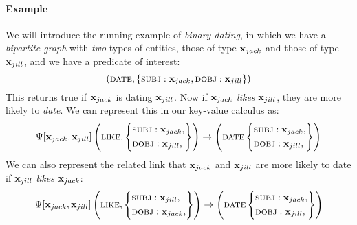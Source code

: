 \documentclass[11pt]{article}
\newcommand{\xvariable}{{\bf x}}
\newcommand{\xjack}{\xvariable_{jack}}
\newcommand{\xjill}{\xvariable_{jill}}
\begin{document}
\paragraph{Example}
We will introduce the running example of {\em binary dating}, in which we have a {\em bipartite graph} with {\em two} types of entities, those of type $\xjack$ and those of type $\xjill$, and we have a predicate of interest:
\begin{equation} (\textsc{date}, \left\{ \textsc{subj}: \xjack, \textsc{dobj}:\xjill\right\}) \end{equation}
This returns true if $\xjack$ is dating $\xjill$.
Now if $\xjack$ {\em likes} $\xjill$, they are more likely to {\em date}.
We can represent this in our key-value calculus as:
\begin{equation}
\Psi[\xjack, \xjill]\left(\textsc{like}, \left\{
    \begin{aligned}
    &\textsc{subj}: \xjack, \\
    &\textsc{dobj}: \xjill, \\
    \end{aligned}
    \right\} \right)
    \rightarrow \left(
    \textsc{date}
\left\{
    \begin{aligned}
    &\textsc{subj}: \xjack, \\
    &\textsc{dobj}: \xjill, \\
    \end{aligned}
    \right\}
    \right)
\label{eq:like-date-same}
\end{equation}
We can also represent the related link that $\xjack$ and $\xjill$ are more likely to date if $\xjill$ {\em likes} $\xjack$:
\begin{equation}
\Psi[\xjack, \xjill]\left(\textsc{like}, \left\{
    \begin{aligned}
    &\textsc{subj}: \xjill, \\
    &\textsc{dobj}: \xjack, \\
    \end{aligned}
    \right\} \right)
    \rightarrow \left(
    \textsc{date}
\left\{
    \begin{aligned}
    &\textsc{subj}: \xjack, \\
    &\textsc{dobj}: \xjill, \\
    \end{aligned}
    \right\}
    \right)
\label{eq:like-date-change}
\end{equation}
\end{document}
